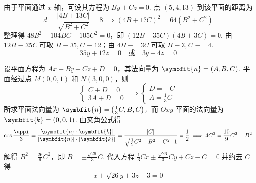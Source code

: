 \begin{solution}

    由于平面通过 $x$ 轴，可设其方程为 $By + Cz = 0$.
    点 $(5, 4, 13)$ 到该平面的距离为
    \begin{equation}
        d = \frac{|4B + 13C|}{\sqrt{B^2 + C^2}} = 8 \implies (4B + 13C)^2 = 64(B^2 + C^2)
    \end{equation}
    整理得 $48B^2 - 104BC - 105C^2 = 0$，即 $(12B - 35C)(4B + 3C) = 0$.
    由 $12B = 35C$ 可取 $B=35, C=12$；由 $4B = -3C$ 可取 $B=3, C=-4$.
    \begin{equation}
        \boxed{35y + 12z = 0 \quad \text{或} \quad 3y - 4z = 0}
    \end{equation}


    设平面方程为 $Ax + By + Cz + D = 0$，其法向量为 $\symbfit{n} = (A, B, C)$.
    平面经过点 $M(0, 0, 1)$ 和 $N(3, 0, 0)$，则
    \begin{equation}
        \begin{cases}
            C + D = 0 \\
            3A + D = 0
        \end{cases} \implies \begin{cases}
            D = -C \\
            A = \frac{1}{3}C
        \end{cases}
    \end{equation}
    所求平面法向量为 $\symbfit{n} = \left(\frac{1}{3}C, B, C\right)$，而 $Oxy$ 平面的法向量为 $\symbfit{k} = (0, 0, 1)$.
    由夹角公式得
    \begin{equation}
        \cos \frac{\uppi}{3} = \frac{|\symbfit{n} \cdot \symbfit{k}|}{|\symbfit{n}| \cdot |\symbfit{k}|} = \frac{|C|}{\sqrt{\frac{1}{9}C^2 + B^2 + C^2} \cdot 1} = \frac{1}{2} \implies 4C^2 = \frac{10}{9}C^2 + B^2
    \end{equation}
    解得 $B^2 = \frac{26}{9}C^2$，即 $B = \pm \frac{\sqrt{26}}{3}C$.
    代入方程 $\frac{1}{3}Cx \pm \frac{\sqrt{26}}{3}Cy + Cz - C = 0$ 并约去 $C$ 得
    \begin{equation}
        \boxed{x \pm \sqrt{26}y + 3z - 3 = 0}
    \end{equation}
\end{solution}


